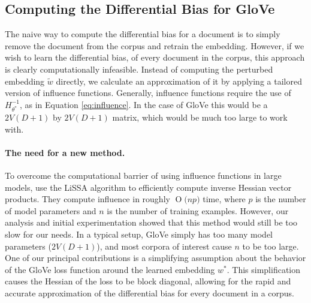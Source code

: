 \documentclass{article}
\newcommand{\xhdr}[1]{\paragraph*{\bf {#1.}}}
\newcommand{\BigO}[1]{\ensuremath{\operatorname{O}\bigl(#1\bigr)}}
\begin{document}
 

\subsection{Computing the Differential Bias for GloVe}\label{sec:diff_bias}
The naive way to compute the differential bias for a document is to simply remove the document from the corpus and retrain the embedding.
However, if we wish to learn the differential bias, of every document in the corpus, this approach is clearly computationally infeasible.
Instead of computing the perturbed embedding $\tilde{w}$ directly, we calculate an approximation of it by applying a tailored version of influence functions. Generally, influence functions require the use of $H_{\theta^*} ^{-1}$, as in Equation \eqref{eq:influence}.
In the case of GloVe this would be a $2V(D+1)$ by $2V(D+1)$ matrix, which would be much too large to work with. 

\xhdr{The need for a new method}
To overcome the computational barrier of using influence functions in large models, \citet{Influence} use the LiSSA algorithm \cite{LiSSA} to efficiently compute inverse Hessian vector products. 
They compute influence in roughly $\BigO{np}$ time, where $p$ is the number of model parameters and $n$ is the number of training examples. 
However, our analysis and initial experimentation showed that this method would still be too slow for our needs. 
In a typical setup, GloVe simply has too many model parameters ($2V(D+1)$), and most corpora of interest cause $n$ to be too large. 
One of our principal contributions is a simplifying assumption about the behavior of the GloVe loss function around the learned embedding $w^*$. This simplification causes the Hessian of the loss to be block diagonal, allowing for the rapid and accurate approximation of the differential bias for every document in a corpus.
\end{document}
